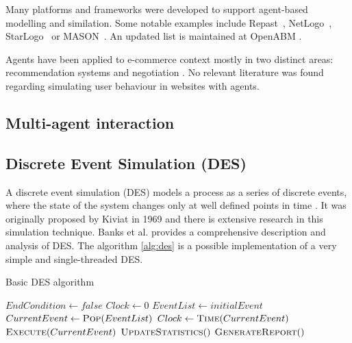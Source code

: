 Many platforms and frameworks were developed to support agent-based modelling 
and similation. Some notable examples include Repast~\cite{collier2003repast}, 
NetLogo~\cite{wilensky1999netlogo}, StarLogo~\cite{resnick1996starlogo} or 
MASON~\cite{panait2005cooperative}. An updated list is maintained at OpenABM 
\cite{OpenABM2016}.

Agents have been applied to e-commerce context mostly in two distinct areas: 
recommendation systems \cite{xiao2007commerce, walter2008model} and negotiation 
\cite{rahwan2002intelligent, maes1999agents}. No relevant literature was found 
regarding simulating user behaviour in websites with agents.

\subsection{Multi-agent interaction}


\subsection{Discrete Event Simulation (DES)} \label{ssec:des}

A discrete event simulation (DES) models a process as a series of discrete 
events, where the state of the system changes only at well defined points in 
time \cite{Siebers2010}. It was originally proposed by Kiviat in 1969 
\cite{Kiviat1969} and there is extensive research in this simulation technique. 
Banks et al. \cite{Banks2004} provides a comprehensive description and analysis 
of DES. The algorithm \ref{alg:des} is a possible implementation of a very 
simple and single-threaded DES.

\begin{algorithm}[h]
    \caption{Basic DES algorithm}
    \label{alg:des}
    \begin{algorithmic}
        \State $EndCondition \gets false$
        \State $Clock \gets 0$
        \State $EventList \gets initialEvent$
        \State $CurrentEvent \gets \Call{Pop}{EventList}$
        \State $Clock \gets \Call{Time}{CurrentEvent}$
        \State $\Call{Execute}{CurrentEvent}$ 
        \State $\Call{UpdateStatistics}$
        \EndWhile
        \State $\Call{GenerateReport}$
    \end{algorithmic}
\end{algorithm}

